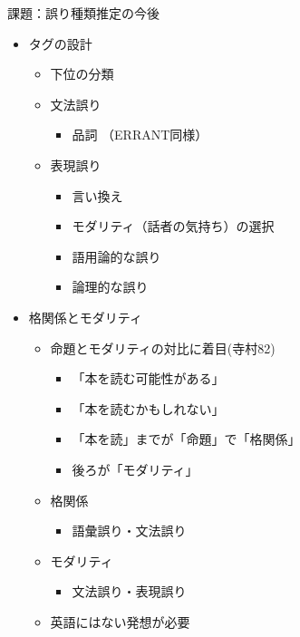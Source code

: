 \documentclass[12pt]{beamer}
\newcommand{\mynum}[2]{%
	{\color{#1}\fontsize{50pt}{0pt}\selectfont\dejavu{\char"#2}\hspace*{-0.35em}}
}
\begin{document}
\begin{frame}[t]
\begin{columns}[t]
\begin{column}{.33\linewidth}
			\begin{block}{\mynum{white}{277E}課題：誤り種類推定の今後}
				\begin{itemize}
					\item[\mynum{blue}{2776}] タグの設計
						\begin{itemize}
							\item 下位の分類
							\item 文法誤り
								\begin{itemize}
									\item 品詞 （ERRANT同様）
								\end{itemize}
							\item 表現誤り
								\begin{itemize}
									\item 言い換え
									\item モダリティ（話者の気持ち）の選択
									\item 語用論的な誤り
									\item 論理的な誤り
								\end{itemize}
						\end{itemize}
					\item[\mynum{blue}{2777}] 格関係とモダリティ
						\begin{itemize}
							\item 命題とモダリティの対比に着目{\footnotesize(寺村82)}\hspace*{-2em}
								\begin{itemize}
									\item 「本を読む可能性がある」
									\item 「本を読むかもしれない」
									\item 「本を読」までが「命題」で「格関係」
									\item 後ろが「モダリティ」
								\end{itemize}
							\item 格関係
								\begin{itemize}
									\item 語彙誤り・文法誤り
								\end{itemize}
							\item モダリティ
								\begin{itemize}
									\item 文法誤り・表現誤り
								\end{itemize}
							\item 英語にはない発想が必要
						\end{itemize}
				\end{itemize}
			\end{block}


		\end{column}
	\end{columns}
\end{frame}
\end{document}
